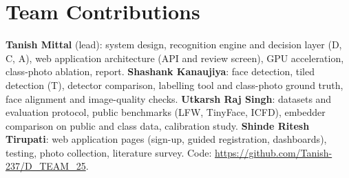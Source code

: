 \documentclass[conference,a4paper]{IEEEtran}
\begin{document}
\section*{Team Contributions}
\textbf{Tanish Mittal} (lead): system design, recognition engine and decision layer (D, C, A), web application architecture (API and review screen), GPU acceleration, class-photo ablation, report. \textbf{Shashank Kanaujiya}: face detection, tiled detection (T), detector comparison, labelling tool and class-photo ground truth, face alignment and image-quality checks. \textbf{Utkarsh Raj Singh}: datasets and evaluation protocol, public benchmarks (LFW, TinyFace, ICFD), embedder comparison on public and class data, calibration study. \textbf{Shinde Ritesh Tirupati}: web application pages (sign-up, guided registration, dashboards), testing, photo collection, literature survey. Code: \url{https://github.com/Tanish-237/D_TEAM_25}.
\end{document}
